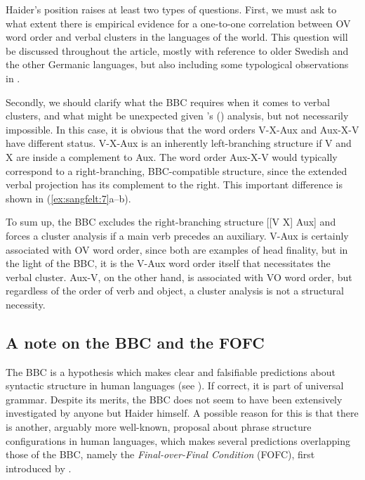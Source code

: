 \documentclass[output=paper, colorlinks, citecolor=brown]{langscibook}
\begin{document}
\ea
\label{ex:sangfelt:6}
 \label{ex:sangfelt:6a}
 \label{ex:sangfelt:6b}
\z
\z 


 Haider’s position raises at least two types of questions. First, we must ask to what extent there is empirical evidence for a one-to-one correlation between OV word order and verbal clusters in the languages of the world. This question will be discussed throughout the article, mostly with reference to older Swedish and the other Germanic languages, but also including some typological observations in .

Secondly, we should clarify what the BBC requires when it comes to verbal clusters, and what might be unexpected given \citeauthor{Haider2010}’s (\citeyear{Haider2010, Haider2013}) analysis, but not necessarily impossible. In this case, it is obvious that the word orders V-X-Aux and Aux-X-V have different status. V-X-Aux is an inherently left-branching structure if V and X are inside a complement to Aux. The word order Aux-X-V would typically correspond to a right-branching, BBC-compatible structure, since the extended verbal projection has its complement to the right. This important difference is shown in (\ref{ex:sangfelt:7}a–b).


\ea
\label{ex:sangfelt:7}
\ex{[\textsubscript{VP1} Aux [\textsubscript{VP2} X V]\label{ex:sangfelt:7b}}
\z 
\z 

To sum up, the BBC excludes the right-branching structure [[V X] Aux] and forces a cluster analysis if a main verb precedes an auxiliary. V-Aux is certainly associated with OV word order, since both are examples of head finality, but in the light of the BBC, it is the V-Aux word order itself that necessitates the verbal cluster. Aux-V, on the other hand, is associated with VO word order, but regardless of the order of verb and object, a cluster analysis is not a structural necessity.

\subsection{A note on the BBC and the FOFC}\label{sec:sangfelt:2.2}

The BBC is a hypothesis which makes clear and falsifiable predictions about syntactic structure in human languages (see \citealt{Haider2013}). If correct, it is part of universal grammar. Despite its merits, the BBC does not seem to have been extensively investigated by anyone but Haider himself. A possible reason for this is that there is another, arguably more well-known, proposal about phrase structure configurations in human languages, which makes several predictions overlapping those of the BBC, namely the \textit{Final-over-Final Condition} (FOFC), first introduced by \citet{Holmberg2000}.
\end{document}
